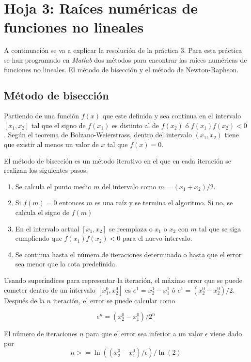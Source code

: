 \section{Hoja 3: Raíces numéricas de funciones no lineales}

A continuación se va a explicar la resolución de la práctica 3.
Para esta práctica se han programado en \textit{Matlab} dos métodos para encontrar las raíces numéricas de funciones no lineales.
El método de bisección y el método de Newton-Raphson.

\subsection{Método de bisección}
Partiendo de una función \(f(x)\) que este definida y sea continua en el intervalo \([x_1, x_2]\) tal que el signo de \(f(x_1)\) es distinto al de \(f(x_2)\) ó \(f(x_1)f(x_2) < 0\). Según el teorema de Bolzano-Weierstrass, dentro del intervalo \((x_1, x_2)\) tiene que existir al menos un valor de \(x\) tal que \(f(x) = 0\).

El método de bisección es un método iterativo en el que en cada iteración se realizan los siguientes pasos:

\begin{enumerate}
    \item Se calcula el punto medio \(m\) del intervalo como \(m = (x_1 + x_2)/2\).
    \item Si \(f(m) = 0\) entonces \(m\) es una raíz y se termina el algoritmo. Si no, se calcula el signo de \(f(m)\)
    \item En el intervalo actual \([x_1, x_2]\) se reemplaza o \(x_1\) o \(x_2\) con \(m\) tal que se siga cumpliendo que \(f(x_1)f(x_2) < 0\) para el nuevo intervalo.
    \item Se continua hasta el número de iteraciones determinado o hasta que el error sea menor que la cota predefinida.
\end{enumerate}

Usando superíndices para representar la iteración, el máximo error que se puede cometer dentro de un intervalo \([x_1^0, x_2^0]\) es \(e^1 = x_2^1 - x_1^1\) ó \(e^1 = (x_2^0 - x_2^0)/2\). Después de la \(n\) iteración, el error se puede calcular como

\[e^n = (x_2^0 - x_1^0)/2^n\]

El número de iteraciones \(n\) para que el error sea inferior a un valor \(\epsilon\) viene dado por
\[n >= \ln((x_2^0 - x_1^0) / \epsilon) / \ln(2)\]

